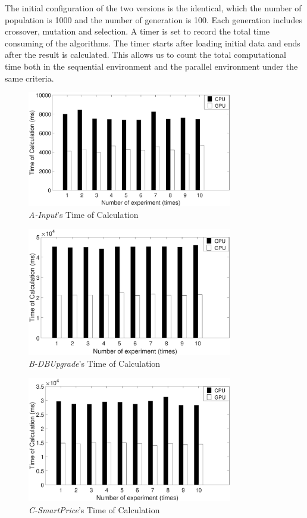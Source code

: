 The initial configuration of the two versions is the identical, which the number
of population is 1000 and the number of generation is 100. Each generation
includes crossover, mutation and selection. A timer is set to record the total
time consuming of the algorithms. The timer starts after loading initial data
and ends after the result is calculated. This allows us to count the total
computational time both in the sequential environment and the parallel
environment under the same criteria.

\begin{figure}[!htb]
  \centering
  \includegraphics[width=0.8\textwidth]{figures/fig_co1.eps}
  \caption{\emph{A-Input}'s Time of Calculation}
  \label{fig:co1}
\end{figure}

\begin{figure}[!htb]
  \centering
  \includegraphics[width=0.8\textwidth]{figures/fig_co2.eps}
  \caption{\emph{B-DBUpgrade}'s Time of Calculation}
  \label{fig:co2}
\end{figure}

\begin{figure}[!htb]
  \centering
  \includegraphics[width=0.8\textwidth]{figures/fig_co3.eps}
  \caption{\emph{C-SmartPrice}'s Time of Calculation}
  \label{fig:co3}
\end{figure}

